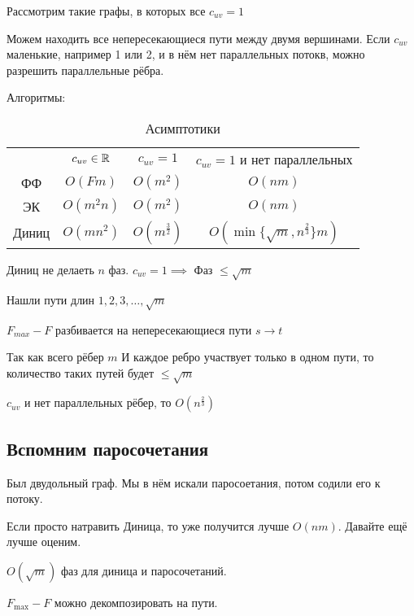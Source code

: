 Рассмотрим такие графы, в которых все $c_{uv} = 1$

Можем находить все непересекающиеся пути между двумя вершинами. Если $c_{uv}$ маленькие, например 1 или 2, и в нём нет параллельных потокв, можно разрешить параллельные рёбра.

Алгоритмы:
\begin{table}[htpb]
    \centering
    \caption{Асимптотики}
    \label{tab:label}
    \begin{tabular}{cccc}
        & $c_{uv}\in \mathbb{R}$ & $c_{uv} = 1$ & $c_{uv}=1$ и нет параллельных\\
        ФФ & $O(Fm)$ & $O(m^2)$ & $O(nm)$\\
        ЭК & $O(m^2n)$ & $O(m^2)$ & $O(nm)$\\
        Диниц & $O(mn^2)$ & $O(m^{\frac{3}{2}})$ & $O(\min\{\sqrt{m}, n^{\frac{2}{3}} \}m)$
    \end{tabular}
\end{table}

\begin{statement}
    Диниц не делаеть $n$ фаз. $c_{uv}=1 \implies $ Фаз $\leqslant \sqrt{m} $
    
    Нашли пути длин $1, 2, 3, \ldots, \sqrt{m} $

    $F_{max} - F$ разбивается на непересекающиеся пути $s \to t$

    Так как всего рёбер $m$ И каждое ребро участвует только в одном пути, то количество таких путей будет $\leqslant \sqrt{m} $
\end{statement}

\begin{statement}
    $c_{uv}$ и нет параллельных рёбер, то $O(n^{\frac{2}{3}})$
\end{statement}

\subsection{Вспомним паросочетания}

Был двудольный граф. Мы в нём искали паросоетания, потом содили его к потоку.

Если просто натравить Диница, то уже получится лучше $O(nm)$. Давайте ещё лучше оценим.

\begin{statement}
    $O(\sqrt{m} )$ фаз для диница и паросочетаний.

    $F_{\max} - F$ можно декомпозировать на пути. 
\end{statement}

